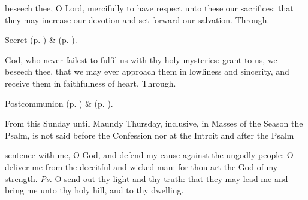 
\secret
{} beseech thee, O Lord, mercifully to have respect unto these our sacrifices: that they may increase our devotion and set forward our salvation. Through.

\begin{rubric}
     Secret  (p. \pageref{AshWednesdayMassSecret}) \&   (p. \pageref{SPLivingDeparted}).
\end{rubric}


\postcommunion
{} God, who never failest to fulfil us with thy holy mysteries: grant to us, we beseech thee, that we may ever approach them in lowliness and sincerity, and receive them in faithfulness of heart. Through.
\begin{rubric}
     Postcommunion  (p. \pageref{AshWednesdayMassPostcommunion}) \&   (p. \pageref{SPLivingDeparted}).
\end{rubric}



\label{PassionSunday}

\begin{rubric}
    From this Sunday until Maundy Thursday, inclusive, in Masses of the Season the Psalm,  is not said before the Confession nor  at the Introit and after the Psalm 
\end{rubric}

\introit
{} sentence with me, O God, and defend my cause against the ungodly people: O deliver me from the deceitful and wicked man: for thou art the God of my strength. \textit{Ps.} O send out thy light and thy truth: that they may lead me and bring me unto thy holy hill, and to thy dwelling.


